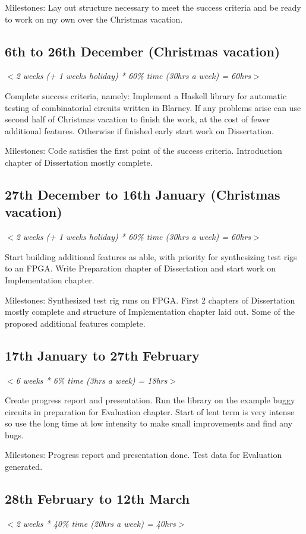 \documentclass[UKenglish, 12pt]{article}
\newcommand{\al}{$<$}
\newcommand{\ar}{$>$}
\begin{document}
Milestones: Lay out structure necessary to meet the success criteria and 
be ready to work on my own over the Christmas vacation.

\subsection*{6th to 26th December (Christmas vacation)}
\al\emph{2 weeks (+ 1 weeks holiday) * 60\% time (30hrs a week) = 60hrs}\ar

Complete success criteria, namely: Implement a Haskell library for automatic
testing of combinatorial circuits written in Blarney. If any problems arise
can use second half of Christmas vacation to finish the work, at the cost of
fewer additional features. Otherwise if finished early start work on
Dissertation.

Milestones: Code satisfies the first point of the success criteria. Introduction
chapter of Dissertation mostly complete.

\subsection*{27th December to 16th January (Christmas vacation)}
\al\emph{2 weeks (+ 1 weeks holiday) * 60\% time (30hrs a week) = 60hrs}\ar

Start building additional features as able, with priority for synthesizing test
rigs to an FPGA. Write Preparation chapter of Dissertation and start work on
Implementation chapter.

Milestones: Synthesized test rig runs on FPGA. First 2 chapters of Dissertation
mostly complete and structure of Implementation chapter laid out. Some of the
proposed additional features complete.

\subsection*{17th January to 27th February}
\al\emph{6 weeks * 6\% time (3hrs a week) = 18hrs}\ar

Create progress report and presentation. 
Run the library on the example buggy circuits in preparation for Evaluation
chapter. Start of lent term is very intense so use the long time at low intensity
to make small improvements and find any bugs.

Milestones: Progress report and presentation done. Test data for Evaluation
generated.

\subsection*{28th February to 12th March}
\al\emph{2 weeks * 40\% time (20hrs a week) = 40hrs}\ar
\end{document}
